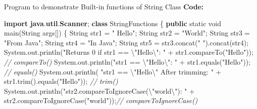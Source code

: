 \documentclass[
  12pt,
]{article}
\author{}
\date{}
\newenvironment{Shaded}{}{}
\newcommand{\BuiltInTok}[1]{\textcolor[rgb]{0.00,0.50,0.00}{#1}}
\newcommand{\CommentTok}[1]{\textcolor[rgb]{0.38,0.63,0.69}{\textit{#1}}}
\newcommand{\DataTypeTok}[1]{\textcolor[rgb]{0.56,0.13,0.00}{#1}}
\newcommand{\FunctionTok}[1]{\textcolor[rgb]{0.02,0.16,0.49}{#1}}
\newcommand{\ImportTok}[1]{\textcolor[rgb]{0.00,0.50,0.00}{\textbf{#1}}}
\newcommand{\KeywordTok}[1]{\textcolor[rgb]{0.00,0.44,0.13}{\textbf{#1}}}
\newcommand{\NormalTok}[1]{#1}
\newcommand{\OperatorTok}[1]{\textcolor[rgb]{0.40,0.40,0.40}{#1}}
\newcommand{\SpecialCharTok}[1]{\textcolor[rgb]{0.25,0.44,0.63}{#1}}
\newcommand{\StringTok}[1]{\textcolor[rgb]{0.25,0.44,0.63}{#1}}
\begin{document}
Program to demonstrate Built-in functions of String Class \textbf{Code:}

\begin{Shaded}
\begin{Highlighting}[numbers=left,,]
\KeywordTok{import} \ImportTok{java}\OperatorTok{.}\ImportTok{util}\OperatorTok{.}\ImportTok{Scanner}\OperatorTok{;}
\KeywordTok{class}\NormalTok{ StringFunctions}
\OperatorTok{\{}
    \KeywordTok{public} \DataTypeTok{static} \DataTypeTok{void} \FunctionTok{main}\OperatorTok{(}\BuiltInTok{String}\NormalTok{ args}\OperatorTok{[])}
    \OperatorTok{\{}
        \BuiltInTok{String}\NormalTok{ str1 }\OperatorTok{=} \StringTok{"    Hello"}\OperatorTok{;}
        \BuiltInTok{String}\NormalTok{ str2 }\OperatorTok{=} \StringTok{"World"}\OperatorTok{;}
        \BuiltInTok{String}\NormalTok{ str3 }\OperatorTok{=} \StringTok{"From Java"}\OperatorTok{;}
        \BuiltInTok{String}\NormalTok{ str4 }\OperatorTok{=} \StringTok{"In Java"}\OperatorTok{;}
        \BuiltInTok{String}\NormalTok{ str5 }\OperatorTok{=}\NormalTok{ str3}\OperatorTok{.}\FunctionTok{concat}\OperatorTok{(}\StringTok{" "}\OperatorTok{).}\FunctionTok{concat}\OperatorTok{(}\NormalTok{str4}\OperatorTok{);}
        \BuiltInTok{System}\OperatorTok{.}\FunctionTok{out}\OperatorTok{.}\FunctionTok{println}\OperatorTok{(}\StringTok{"Returns 0 if str1 == }\SpecialCharTok{\textbackslash{}"}\StringTok{Hello}\SpecialCharTok{\textbackslash{}"}\StringTok{: "} \OperatorTok{+}\NormalTok{ str1}\OperatorTok{.}\FunctionTok{compareTo}\OperatorTok{(}\StringTok{"Hello"}\OperatorTok{));} \CommentTok{// compareTo()}
        \BuiltInTok{System}\OperatorTok{.}\FunctionTok{out}\OperatorTok{.}\FunctionTok{println}\OperatorTok{(}\StringTok{"str1 == }\SpecialCharTok{\textbackslash{}"}\StringTok{Hello}\SpecialCharTok{\textbackslash{}"}\StringTok{: "} \OperatorTok{+}\NormalTok{ str1}\OperatorTok{.}\FunctionTok{equals}\OperatorTok{(}\StringTok{"Hello"}\OperatorTok{));}        \CommentTok{// equals()}
        \BuiltInTok{System}\OperatorTok{.}\FunctionTok{out}\OperatorTok{.}\FunctionTok{println}\OperatorTok{(} \StringTok{"str1 == }\SpecialCharTok{\textbackslash{}"}\StringTok{Hello}\SpecialCharTok{\textbackslash{}"}\StringTok{ After trimming: "} \OperatorTok{+}\NormalTok{ str1}\OperatorTok{.}\FunctionTok{trim}\OperatorTok{().}\FunctionTok{equals}\OperatorTok{(}\StringTok{"Hello"}\OperatorTok{));} \CommentTok{// trim()}
        \BuiltInTok{System}\OperatorTok{.}\FunctionTok{out}\OperatorTok{.}\FunctionTok{println}\OperatorTok{(}\StringTok{"str2.compareToIgnoreCase(}\SpecialCharTok{\textbackslash{}"}\StringTok{world}\SpecialCharTok{\textbackslash{}"}\StringTok{): "} \OperatorTok{+}\NormalTok{ str2}\OperatorTok{.}\FunctionTok{compareToIgnoreCase}\OperatorTok{(}\StringTok{"world"}\OperatorTok{));}\CommentTok{// compareToIgnoreCase()}

\end{Highlighting}
\end{Shaded}
\end{document}
